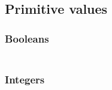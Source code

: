 \subsection*{Primitive values}\hypertarget{primitive-values}{}\label{primitive-values}

\subsubsection*{Booleans}\hypertarget{booleans}{}\label{booleans}

\begin{align*}
  [ ~ 
  \KEY{Datatype} ~ & \NAMEHYPER{../../../../../Funcons-beta/Values/Primitive}{Booleans}{booleans} \\
  \KEY{Alias} ~ & \NAMEHYPER{../../../../../Funcons-beta/Values/Primitive}{Booleans}{bools} \\
  \KEY{Funcon} ~ & \NAMEHYPER{../../../../../Funcons-beta/Values/Primitive}{Booleans}{true} \\
  \KEY{Funcon} ~ & \NAMEHYPER{../../../../../Funcons-beta/Values/Primitive}{Booleans}{false}
  ~ ]
\end{align*}
\subsubsection*{Integers}\hypertarget{integers}{}\label{integers}

